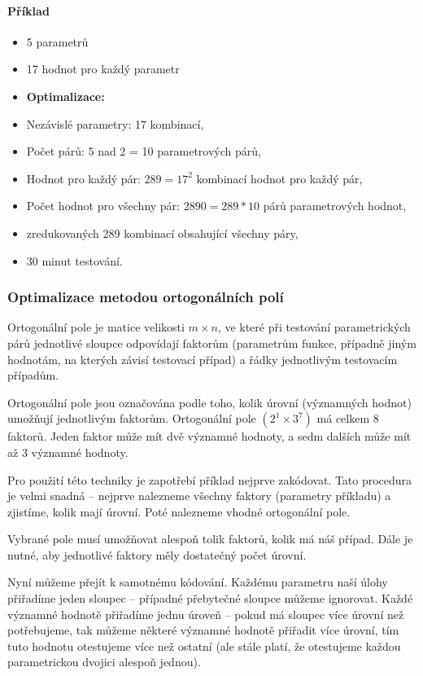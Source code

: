 \paragraph{Příklad}
\begin{itemize}[itemsep=0px]
\item 5 parametrů
\item 17 hodnot pro každý parametr
\item \textbf{Optimalizace:}
\item Nezávislé parametry: 17 kombinací,
\item Počet párů: 5 nad 2 = 10 parametrových párů,
\item Hodnot pro každý pár: $289 = 17^2$ kombinací hodnot pro každý pár,
\item Počet hodnot pro všechny pár: $2890 = 289*10$ párů parametrových hodnot,
\item zredukovaných 289 kombinací obsahující všechny páry,
\item 30 minut testování.
\end{itemize}

\subsubsection{Optimalizace metodou ortogonálních polí}
Ortogonální pole je matice velikosti $m \times n$, ve které při testování parametrických párů jednotlivé sloupce odpovídají faktorům (parametrům funkce, případně jiným hodnotám, na kterých závisí testovací případ) a řádky jednotlivým testovacím případům.

Ortogonální pole jsou označována podle toho, kolik úrovní (významných hodnot) umožňují jednotlivým faktorům. Ortogonální pole $(2^{1} \times 3^{7})$ má celkem 8 faktorů. Jeden faktor může mít dvě významné hodnoty, a sedm dalších může mít až 3 významné hodnoty.

Pro použití této techniky je zapotřebí příklad nejprve zakódovat. Tato procedura je velmi snadná – nejprve nalezneme všechny faktory (parametry příkladu) a zjistíme, kolik mají úrovní. Poté nalezneme vhodné ortogonální pole.

Vybrané pole musí umožňovat alespoň tolik faktorů, kolik má náš případ. Dále je nutné, aby jednotlivé faktory měly dostatečný počet úrovní.

Nyní můžeme přejít k samotnému kódování. Každému parametru naší úlohy přiřadíme jeden sloupec – případné přebytečné sloupce můžeme ignorovat. Každé významné hodnotě přiřadíme jednu úroveň – pokud má sloupec více úrovní než potřebujeme, tak můžeme některé významné hodnotě přiřadit více úrovní, tím tuto hodnotu otestujeme více než ostatní (ale stále platí, že otestujeme každou parametrickou dvojici alespoň jednou).

